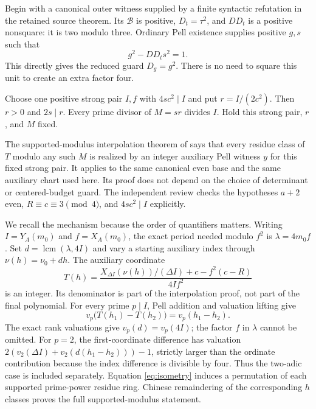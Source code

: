 Begin with a canonical outer witness supplied by a finite syntactic
refutation in the retained source theorem. Its $\mathcal B$ is positive,
$D_t=\tau^2$, and $DD_t$ is a positive nonsquare: it is two modulo
three. Ordinary Pell existence supplies positive $g,s$ such that
\[
 g^2-DD_t s^2=1.
\]
This directly gives the reduced guard $D_g=g^2$. There is no need to
square this unit to create an extra factor four.

Choose one positive strong pair $I,f$ with $4sc^2\mid I$ and put
$r=I/(2c^2)$. Then $r>0$ and $2s\mid r$. Every prime divisor of
$M=sr$ divides $I$. Hold this strong pair, $r$, and $M$ fixed.

The supported-modulus interpolation theorem of \cite{round14} says
that every residue class of $T$ modulo any such $M$ is realized by an
integer auxiliary Pell witness $y$ for this fixed strong pair. It
applies to the same canonical even base and the same auxiliary chart
used here. Its proof does not depend on the choice of determinant or
centered-budget guard. The independent review checks the hypotheses
$a+2$ even, $R\equiv c\equiv3\pmod4$, and $4sc^2\mid I$ explicitly.

We recall the mechanism because the order of quantifiers matters.
Writing $I=Y_A(m_0)$ and $f=X_A(m_0)$, the exact period needed modulo
$f^2$ is $\lambda=4m_0f$. Set $d=\operatorname{lcm}(\lambda,4I)$ and
vary a starting auxiliary index through $\nu(h)=\nu_0+dh$.
The auxiliary coordinate
\begin{equation}
 T(h)=\frac{X_{\Delta I}(\nu(h))/(\Delta I)+c-f^2(c-R)}{4If^2}
 \label{eq:interp-coordinate}
\end{equation}
is an integer. Its denominator is part of the interpolation proof, not
part of the final polynomial. For every prime $p\mid I$, Pell addition
and valuation lifting give
\begin{equation}
 v_p\bigl(T(h_1)-T(h_2)\bigr)=v_p(h_1-h_2).
 \label{eq:isometry}
\end{equation}
The exact rank valuations give $v_p(d)=v_p(4I)$; the factor $f$ in
$\lambda$ cannot be omitted. For $p=2$, the first-coordinate difference
has valuation $2(v_2(\Delta I)+v_2(d(h_1-h_2)))-1$, strictly larger
than the ordinate contribution because the index difference is
divisible by four. Thus the two-adic case is included separately.
Equation \eqref{eq:isometry} induces a permutation of each supported
prime-power residue ring. Chinese remaindering of the corresponding
$h$ classes proves the full supported-modulus statement.

